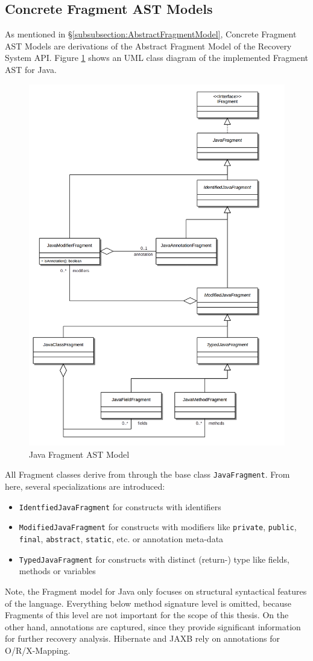 \subsection{Concrete Fragment AST Models}
\label{subsection:ConcreteFragmentASTModels}
As mentioned in §\ref{subsubsection:AbstractFragmentModel}, Concrete \Gls{Fragment} \gls{AST} Models are derivations of the Abstract Fragment Model of the Recovery System \gls{API}.
Figure \ref{figure:JavaFragmentASTModel} shows an \gls{UML} class diagram of the implemented \Gls{Fragment} \gls{AST} for \gls{Java}.
\begin{figure}[h!]
\begin{center}
\includegraphics[width=.7\textwidth]{images/JavaFragmentModel.png}
\end{center}
\caption{Java Fragment AST Model}
\label{figure:JavaFragmentASTModel}
\end{figure}
All \gls{Fragment} classes derive from  through the base class \texttt{JavaFragment}.
From here, several specializations are introduced:
\begin{itemize}
\item
\texttt{IdentfiedJavaFragment} for constructs with identifiers
\item
\texttt{ModifiedJavaFragment} for constructs with modifiers like \texttt{private}, \texttt{public}, \texttt{final}, \texttt{abstract}, \texttt{static}, etc. or annotation meta-data
\item
\texttt{TypedJavaFragment} for constructs with distinct (return-) type like fields, methods or variables
\end{itemize}
Note, the \gls{Fragment} model for \gls{Java} only focuses on structural syntactical features of the language.
Everything below method signature level is omitted, because \glspl{Fragment} of this level are not important for the scope of this thesis.
On the other hand, annotations are captured, since they provide significant information for further recovery analysis.
\gls{Hibernate} and \gls{JAXB} rely on annotations for \gls{O/R/X-Mapping}.

